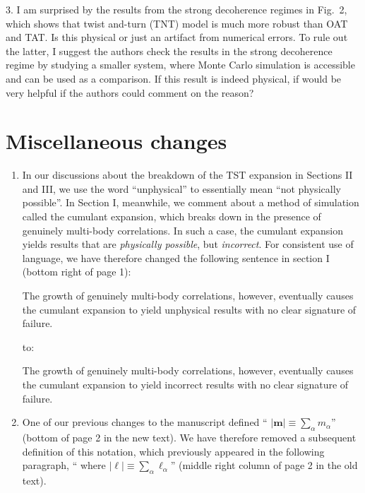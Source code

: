 \documentclass[preprint,superscriptaddress]{revtex4-2}
\renewcommand{\v}{\bm} %
\renewcommand{\abs}[1]{\lvert #1 \rvert}
\newcommand{\1}{\mathds{1}}
\newcommand{\blue}[1]{{\color{blue} #1}}
\newcommand{\red}[1]{{\color{red} #1}}
\newcommand{\green}[1]{{\color{ForestGreen} #1}}
\begin{document}
\begin{enumerate}
  \blue{3. I am surprised by the results from the strong decoherence
    regimes in Fig.~2, which shows that twist and-turn (TNT) model is
    much more robust than OAT and TAT. Is this physical or just an
    artifact from numerical errors. To rule out the latter, I suggest
    the authors check the results in the strong decoherence regime by
    studying a smaller system, where Monte Carlo simulation is
    accessible and can be used as a comparison. If this result is
    indeed physical, if would be very helpful if the authors could
    comment on the reason?}



\end{enumerate}

\section{Miscellaneous changes}

\begin{enumerate}
\item In our discussions about the breakdown of the TST expansion in
  Sections II and III, we use the word ``unphysical'' to essentially
  mean ``not physically possible''.  In Section I, meanwhile, we
  comment about a method of simulation called the cumulant expansion,
  which breaks down in the presence of genuinely multi-body
  correlations.  In such a case, the cumulant expansion yields results
  that are {\it physically possible}, but {\it incorrect}.  For
  consistent use of language, we have therefore changed the following
  sentence in section I (bottom right of page 1):

  \red{The growth of genuinely multi-body correlations, however,
    eventually causes the cumulant expansion to yield unphysical
    results with no clear signature of failure.}

  to:

  \green{The growth of genuinely multi-body correlations, however,
    eventually causes the cumulant expansion to yield incorrect
    results with no clear signature of failure.}


\item One of our previous changes to the manuscript defined
  ``\green{$\abs{\v m}\equiv\sum_\alpha m_\alpha$}'' (bottom of page 2
  in the new text).  We have therefore removed a subsequent definition
  of this notation, which previously appeared in the following
  paragraph, ``\red{where
    $\abs{\v\ell}\equiv\sum_\alpha\ell_\alpha$}'' (middle right column
  of page 2 in the old text).

\end{enumerate}
\end{document}
